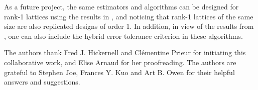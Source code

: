 As a future project, the same estimators and algorithms can be designed for rank-1 lattices using the results in \cite{JimHic}, and noticing that rank-1 lattices of the same size are also replicated designs of order 1. In addition, in view of the results from \cite{HicJimLi}, one can also include the hybrid error tolerance criterion in these algorithms.

\begin{acknowledgements}
The authors thank Fred J. Hickernell and \break Cl\'ementine Prieur for initiating this collaborative work, and Elise \break Arnaud for her proofreading. The authors are grateful to Stephen Joe, Frances Y. Kuo and Art B. Owen for their helpful answers and suggestions.   
\end{acknowledgements}


